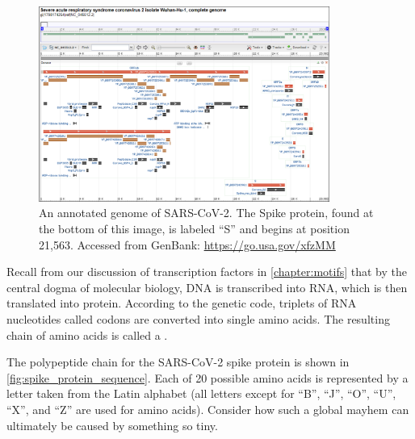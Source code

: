 \begin{figure}[h]
	\centering
	\mySfFamily
	\includegraphics[width = 0.85\textwidth]{../images/SARSCoV2Annotation.png}
	\caption{An annotated genome of SARS-CoV-2. The Spike protein, found at the bottom of this image, is labeled ``S'' and begins at position 21,563. Accessed from GenBank: \url{https://go.usa.gov/xfzMM}}
	\label{fig:SARSCoV2Annotation}
\end{figure}

Recall from our discussion of transcription factors in \autoref{chapter:motifs} that by the central dogma of molecular biology, DNA is transcribed into RNA, which is then translated into protein. According to the genetic code, triplets of RNA nucleotides called codons are converted into single amino acids. The resulting chain of amino acids is called a .

The polypeptide chain for the SARS-CoV-2 spike protein is shown in \autoref{fig:spike_protein_sequence}. Each of 20 possible amino acids is represented by a letter taken from the Latin alphabet (all letters except for ``B'', ``J'', ``O'', ``U'', ``X'', and ``Z'' are used for amino acids). Consider how such a global mayhem can ultimately be caused by something so tiny.\\

